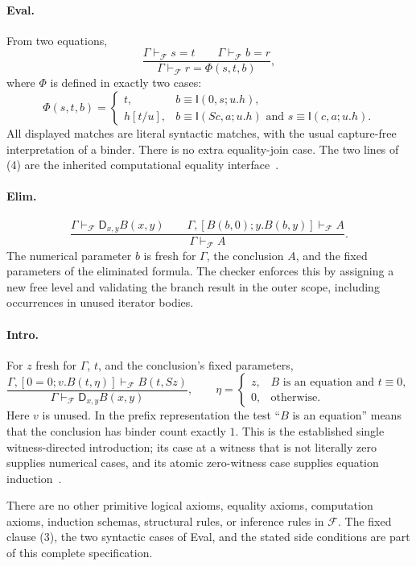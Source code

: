 \documentclass[11pt]{article}
\theoremstyle{definition}\newtheorem{definition}[theorem]{Definition}
\theoremstyle{remark}\newtheorem{remark}[theorem]{Remark}
\newcommand{\I}{\mathsf I}
\newcommand{\D}{\mathsf D}
\newcommand{\F}{\mathcal F}
\begin{document}
\paragraph{Eval.}
From two equations,
\[
 \frac{\Gamma\vdash_\F s=t\qquad\Gamma\vdash_\F b=r}
      {\Gamma\vdash_\F r=\Phi(s,t,b)},
 \tag{Eval}
\]
where $\Phi$ is defined in exactly two cases:
\[
 \Phi(s,t,b)=
 \begin{cases}
 t,&b\equiv\I(0,s;u.h),\\[2pt]
 h[t/u],&b\equiv\I(Sc,a;u.h)\text{ and }s\equiv\I(c,a;u.h).
 \end{cases}
 \tag{4}\label{eq:phi}
\]
All displayed matches are literal syntactic matches, with the usual
capture-free interpretation of a binder. There is no extra equality-join
case. The two lines of (4) are the inherited computational equality
interface~\cite{eval,clausal}.

\paragraph{Elim.}
\[
 \frac{\Gamma\vdash_\F\D_{x,y}B(x,y)\qquad
       \Gamma,[B(b,0);y.B(b,y)]\vdash_\F A}
      {\Gamma\vdash_\F A}.
 \tag{Elim}
\]
The numerical parameter $b$ is fresh for $\Gamma$, the conclusion $A$,
and the fixed parameters of the eliminated formula. The checker enforces
this by assigning a new free level and validating the branch result in
the outer scope, including occurrences in unused iterator bodies.

\paragraph{Intro.}
For $z$ fresh for $\Gamma$, $t$, and the conclusion's fixed parameters,
\[
 \frac{\Gamma,[0=0;v.B(t,\eta)]\vdash_\F B(t,Sz)}
      {\Gamma\vdash_\F\D_{x,y}B(x,y)},
 \qquad
 \eta=\begin{cases}
 z,&B\text{ is an equation and }t\equiv0,\\
 0,&\text{otherwise}.
 \end{cases}
 \tag{Intro}\label{eq:intro}
\]
Here $v$ is unused. In the prefix representation the test ``$B$ is an
equation'' means that the conclusion has binder count exactly $1$.
This is the established single witness-directed introduction; its case at
a witness that is not literally zero supplies numerical cases, and its
atomic zero-witness case supplies equation induction~\cite{repo,witness}.

There are no other primitive logical axioms, equality axioms, computation
axioms, induction schemas, structural rules, or inference rules in $\F$.
The fixed clause (3), the two syntactic cases of Eval, and the stated side
conditions are part of this complete specification.
\end{document}
